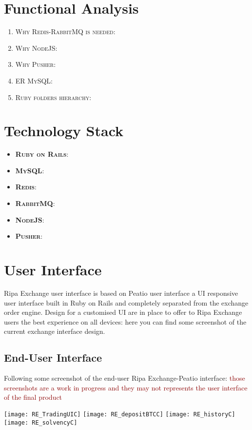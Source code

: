\documentclass[11pt,fleqn,oneside]{book} %
\begin{document}
\section{Functional Analysis}
\begin{enumerate}
	\item \textsc{Why Redis-RabbitMQ is needed}:
	\item \textsc{Why NodeJS}: 
	\item \textsc{Why Pusher}:
	\item \textsc{ER MySQL}:
	\item \textsc{Ruby folders hierarchy}:
\end{enumerate}

\section{Technology Stack}
\begin{itemize}
	\item \textbf{\textsc{Ruby on Rails}}:
	\item \textbf{\textsc{MySQL}}: 
	\item \textbf{\textsc{Redis}}:
	\item \textbf{\textsc{RabbitMQ}}:
	\item \textbf{\textsc{NodeJS}}:
	\item \textbf{\textsc{Pusher}}:
\end{itemize}

\section{User Interface}
Ripa Exchange user interface is based on Peatio user interface a UI responsive user interface built in Ruby on Rails and 
completely separated from the exchange order engine.
Design for a customised UI are in place to offer to Ripa Exchange users the best experience on all devices: here you can find
some screenshot of the current exchange interface design.

\subsection{End-User Interface}
Following some screenshot of the end-user Ripa Exchange-Peatio interface: 
\textcolor{darkred}{those screenshots are a work in progress and they may not represents the user interface of the final product}\\
\begin{center}
	\texttt{[image: RE\_TradingUIC]}
	\texttt{[image: RE\_depositBTCC]}
	\texttt{[image: RE\_historyC]}
	\texttt{[image: RE\_solvencyC]}
\end{center}
\end{document}
